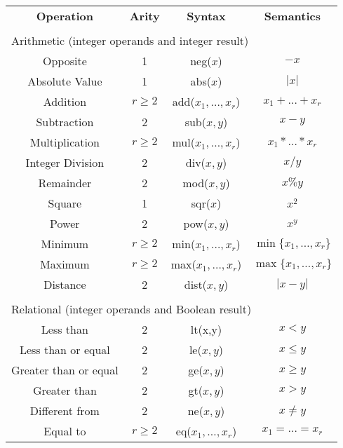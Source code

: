 \documentclass[10pt]{article}
\begin{document}
\begin{table}[p]
\begin{center}
{\footnotesize
\begin{tabular}{cccc} 
\rowcolor{v2lgray}{} {\textcolor{dred}{\bf Operation}} &  {\textcolor{dred}{\bf Arity}} &  {\textcolor{dred}{\bf Syntax}} &  {\textcolor{dred}{\bf Semantics}} \\
\multicolumn{2}{c}{ } \\
\multicolumn{4}{l}{\textcolor{dred}{Arithmetic (integer operands and integer result)}} \\
\midrule
Opposite  & 1 & neg($x$) & $-x$ \\
Absolute Value &  1 & abs($x$) & $| x |$ \\
Addition    & $r \geq 2$ & add($x_1,\ldots,x_r$) & $x_1 + \ldots + x_r$ \\
Subtraction & 2 & sub($x,y$) & $x - y$ \\
Multiplication & $r \geq 2$ & mul($x_1,\ldots,x_r$) & $x_1 * \ldots * x_r$ \\
Integer Division & 2 & div($x,y$) & $x / y$ \\
Remainder  & 2 & mod($x,y$) & $x \% y$ \\ 
Square  & 1 & sqr($x$) & $x^2$ \\
Power  & 2 & pow($x,y$) & $x^{y}$ \\
Minimum & $r \geq 2$ & min($x_1,\ldots,x_r$) & $\min \{x_1,\ldots,x_r\}$ \\
Maximum & $r \geq 2$ & max($x_1,\ldots,x_r$) & $\max \{x_1,\ldots,x_r\}$ \\
Distance  & 2 & dist($x,y$) & $| x - y |$ \\
\midrule
\multicolumn{2}{c}{ } \\
\multicolumn{4}{l}{\textcolor{dred}{Relational (integer operands and Boolean result)}} \\
\midrule
Less than     & 2 & lt(x,y) & $x < y$ \\
Less than or equal     & 2 & le($x,y$) & $x \leq y$ \\
Greater than or equal     & 2 & ge($x,y$) & $x \geq y$ \\
Greater than     & 2 & gt($x,y$) & $x > y$ \\
Different from    & 2 &  ne($x,y$) & $x \neq y$ \\
Equal to    & $r \geq 2$ & eq($x_1,\ldots,x_r$) & $x_1 = \ldots = x_r$ \\

\end{tabular}}
\end{center}
\end{table}
\end{document}
